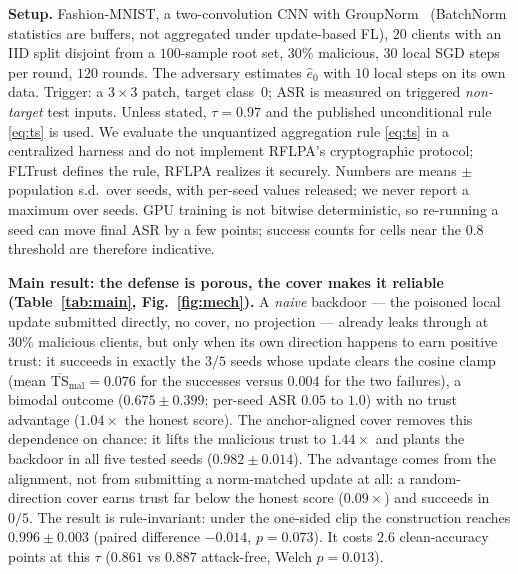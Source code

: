 \documentclass{article}
\begin{document}
\noindent\textbf{Setup.} Fashion-MNIST, a two-convolution CNN with
GroupNorm~\cite{groupnorm} (BatchNorm statistics are buffers, not aggregated under update-based FL), $20$ clients with an IID split disjoint from a
$100$-sample root set, $30\%$ malicious, $30$ local SGD steps per round,
$120$ rounds. The adversary estimates $\hat e_0$ with $10$ local steps on its own
data. Trigger: a $3\times3$ patch, target class~$0$; ASR is measured on triggered
\emph{non-target} test inputs. Unless stated, $\tau=0.97$ and the published
unconditional rule \eqref{eq:ts} is used. We evaluate the unquantized aggregation rule \eqref{eq:ts} in a centralized harness and do not implement RFLPA's cryptographic protocol; FLTrust defines the rule, RFLPA realizes it securely. Numbers are means $\pm$ population s.d.\ over seeds, with per-seed values released; we never report a maximum over
seeds. GPU training is not bitwise deterministic, so re-running a seed can move
final ASR by a few points; success counts for cells near the $0.8$ threshold are
therefore indicative.

\noindent\textbf{Main result: the defense is porous, the cover makes it
reliable (Table~\ref{tab:main}, Fig.~\ref{fig:mech}).} A \emph{naive} backdoor
--- the poisoned local update submitted directly, no cover, no projection ---
already leaks through at $30\%$ malicious clients, but only when its own direction happens to earn positive trust: it succeeds in exactly the $3/5$ seeds whose update clears the cosine clamp (mean $\overline{\mathrm{TS}}_{\mathrm{mal}}=0.076$ for the successes versus $0.004$ for the two failures), a bimodal outcome ($0.675\pm0.399$; per-seed ASR $0.05$ to $1.0$) with no trust advantage ($1.04\times$ the honest score). The anchor-aligned cover removes this dependence on chance: it lifts the malicious trust to $1.44\times$ and plants the backdoor in all five tested seeds ($0.982\pm0.014$). The advantage comes from the alignment, not from submitting a norm-matched update at all: a random-direction cover earns trust far below the honest score ($0.09\times$) and succeeds in $0/5$. The result is rule-invariant: under the one-sided clip the
construction reaches $0.996\pm0.003$ (paired difference $-0.014$, $p=0.073$). It
costs $2.6$ clean-accuracy points at this $\tau$ ($0.861$ vs $0.887$ attack-free,
Welch $p=0.013$).
\end{document}
